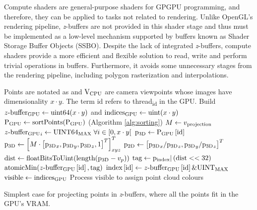 Compute shaders are general-purpose shaders for GPGPU programming, and therefore, they can be applied to tasks not related to rendering. Unlike OpenGL's rendering pipeline, \textit{z}-buffers are not provided in this shader stage and thus must be implemented as a low-level mechanism supported by buffers known as Shader Storage Buffer Objects (SSBO). Despite the lack of integrated \textit{z}-buffers, compute shaders provide a more efficient and flexible solution to read, write and perform trivial operations in buffers. Furthermore, it avoids some unnecessary stages from the rendering pipeline, including polygon rasterization and interpolations. 

\begin{algorithm}
  \begin{algorithmic}[1]
    \State Points are notated as \Points and $\textrm{V}\textsubscript{CPU}$ are camera viewpoints whose images have dimensionality $x \cdot y$. The term id refers to \textrm{thread}\textsubscript{id} in the GPU. %
    \State Build $z\textrm{-buffer}\textsubscript{GPU} \gets \textrm{uint64}(x \cdot y)$ and $\textrm{indices}\textsubscript{GPU} \gets \textrm{uint}(x \cdot y)$ %
        \State $\textrm{P}\textsubscript{GPU} \gets \textrm{sortPoints}(\textrm{P}\textsubscript{GPU})$   \Comment(Algorithm \ref{alg:sorting}) %
    \EndIf
            \State $M \gets v\textsubscript{projection}$ %
                \State $z\textrm{-buffer}\textsubscript{GPU}_{i} \gets \textrm{UINT64\textsubscript{MAX}} \hspace{1mm} \forall i \in \left[0, x \cdot y\right[$ %
            \EndProcedure
                \State $\textrm{p}\textsubscript{3D} \gets \textrm{P}\textsubscript{GPU}\left[\textrm{id}\right]$ %
                \State $\textrm{p}\textsubscript{3D} \gets \left[M \cdot \left[\textrm{p}\textsubscript{3D}_x, \textrm{p}\textsubscript{3D}_y, \textrm{p}\textsubscript{3D}_z, 1\right]^T\right]_{xyz}^T$ %
                \State $\textrm{p}\textsubscript{2D} \gets \left[\textrm{p}\textsubscript{3D}_x / \textrm{p}\textsubscript{3D}_z, \textrm{p}\textsubscript{3D}_y / \textrm{p}\textsubscript{3D}_z\right]^T$ %
                    \State $\textrm{dist} \gets \textrm{floatBitsToUint}(\textrm{length}(\textrm{p}\textsubscript{3D} - v_p))$ %
                    \State $\textrm{tag} \gets \textrm{p}\textsubscript{index} | \left(\textrm{dist} << 32\right)$ %
                    \State $\textrm{atomicMin}(z\textrm{-buffer}\textsubscript{GPU}\left[\textrm{id}\right], \textrm{tag})$ %
                \EndIf
            \EndProcedure
                \State $\textrm{index}\left[\textrm{id}\right] \gets z\textrm{-buffer}\textsubscript{GPU}\left[\textrm{id}\right] \& \textrm{UINT\textsubscript{MAX}}$ %
            \EndProcedure
            \State $\textrm{visible} \gets \textrm{indices}\textsubscript{GPU}$ %
            \State Process $\textrm{visible}$ to assign point cloud colours %
        \EndFor
    \EndProcedure
    \caption{Simplest case for projecting points in \textit{z}-buffers, where all the points fit in the GPU's VRAM.}
    \label{alg:gpu_single_batch}
  \end{algorithmic}
\end{algorithm}

